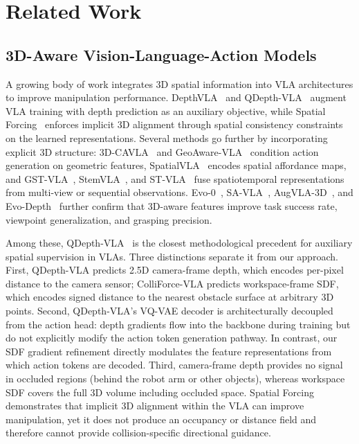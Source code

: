 \section{Related Work}\label{sec:related}

\subsection{3D-Aware Vision-Language-Action Models}

A growing body of work integrates 3D spatial information into VLA architectures to improve manipulation performance. DepthVLA~\cite{depthvla2025} and QDepth-VLA~\cite{li2025qdepth} augment VLA training with depth prediction as an auxiliary objective, while Spatial Forcing~\cite{li2025spatialforcing} enforces implicit 3D alignment through spatial consistency constraints on the learned representations. Several methods go further by incorporating explicit 3D structure: 3D-CAVLA~\cite{3dcavla2025} and GeoAware-VLA~\cite{geoaware2025} condition action generation on geometric features, SpatialVLA~\cite{spatialvla2025} encodes spatial affordance maps, and GST-VLA~\cite{gstvla2026}, StemVLA~\cite{stemvla2026}, and ST-VLA~\cite{stvla2026} fuse spatiotemporal representations from multi-view or sequential observations. Evo-0~\cite{evo02025}, SA-VLA~\cite{savla2026}, AugVLA-3D~\cite{augvla3d2026}, and Evo-Depth~\cite{evodepth2026} further confirm that 3D-aware features improve task success rate, viewpoint generalization, and grasping precision.

Among these, QDepth-VLA~\cite{li2025qdepth} is the closest methodological precedent for auxiliary spatial supervision in VLAs. Three distinctions separate it from our approach. First, QDepth-VLA predicts 2.5D camera-frame depth, which encodes per-pixel distance to the camera sensor; ColliForce-VLA predicts workspace-frame SDF, which encodes signed distance to the nearest obstacle surface at arbitrary 3D points. Second, QDepth-VLA's VQ-VAE decoder is architecturally decoupled from the action head: depth gradients flow into the backbone during training but do not explicitly modify the action token generation pathway. In contrast, our SDF gradient refinement directly modulates the feature representations from which action tokens are decoded. Third, camera-frame depth provides no signal in occluded regions (behind the robot arm or other objects), whereas workspace SDF covers the full 3D volume including occluded space. Spatial Forcing~\cite{li2025spatialforcing} demonstrates that implicit 3D alignment within the VLA can improve manipulation, yet it does not produce an occupancy or distance field and therefore cannot provide collision-specific directional guidance.

